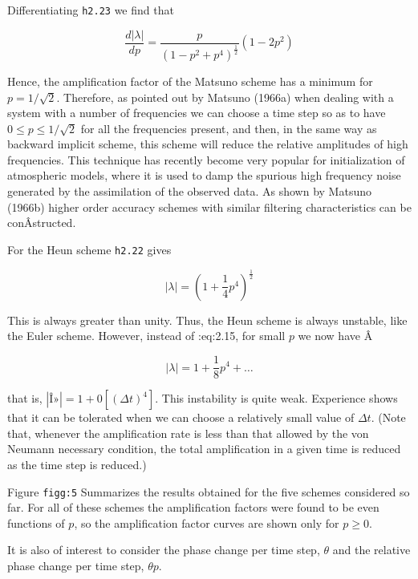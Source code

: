 Differentiating \texttt{h2.23} we find that

{\[\frac{d |\lambda|}{d p} = \frac{p}{( 1 - p^2 + p^4 )^{\frac{1}{2}} } ( 1 - 2 p^2 )\]}

Hence, the amplification factor of the Matsuno scheme has a minimum for
\(p = 1/\sqrt{2}\). Therefore, as pointed out by Matsuno (1966a) when
dealing with a system with a number of frequencies we can choose a time
step so as to have \(0 \leq p \leq 1/\sqrt{2}\) for all the frequencies
present, and then, in the same way as backward implicit scheme, this
scheme will reduce the relative amplitudes of high frequencies. This
technique has recently become very popular for initialization of
atmospheric models, where it is used to damp the spurious high frequency
noise generated by the assimilation of the observed data. As shown by
Matsuno (1966b) higher order accuracy schemes with similar filtering
characteristics can be conÂ­structed.

For the Heun scheme \texttt{h2.22} gives

{\[| \lambda | = \left( 1 + \frac{1}{4}p^{4} \right)^{\frac{1}{2}}\]}

This is always greater than unity. Thus, the Heun scheme is always
unstable, like the Euler scheme. However, instead of :eq:2.15, for small
\(p\) we now have Â­

{\[| \lambda | = 1 + \frac{1}{8}p^{4} + \ldots\]}

that is,
\(\left| \text{Î»} \right| = 1 + 0\left\lbrack \left( \Delta t \right)^{4} \right\rbrack\).
This instability is quite weak. Experience shows that it can be
tolerated when we can choose a relatively small value of \(\Delta t\).
(Note that, whenever the amplification rate is less than that allowed by
the von Neumann necessary condition, the total amplification in a given
time is reduced as the time step is reduced.)

\begin{figure}
\centering
{}
\caption{}
\end{figure}

Figure \texttt{figg:5} Summarizes the results obtained for the five
schemes considered so far. For all of these schemes the amplification
factors were found to be even functions of \(p\), so the amplification
factor curves are shown only for \(p \geq 0\).

It is also of interest to consider the phase change per time step,
\(\theta\) and the relative phase change per time step, \(\theta p\).

